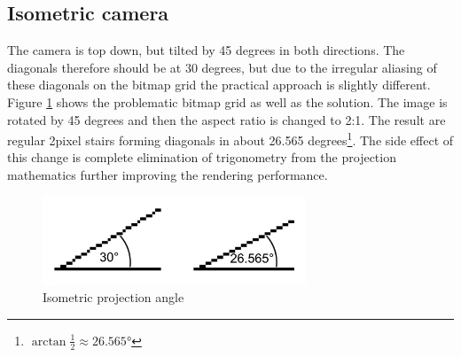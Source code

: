 \documentclass[11pt,oneside, final]{fithesis2}
\begin{document}
\subsection{Isometric camera}
The camera is top down, but tilted by 45 degrees in both directions. The diagonals therefore should be at 30 degrees, but due to the irregular aliasing of these diagonals on the bitmap grid the practical approach is slightly different. Figure \ref{isoangle} shows the problematic bitmap grid as well as the solution. The image is rotated by 45 degrees and then the aspect ratio is changed to 2:1. The result are regular 2pixel stairs forming diagonals in about 26.565 degrees\footnote{\begin{math}\arctan \frac{1}{2} \approx 26.565\si{\degree}\end{math}}. The side effect of this change is complete elimination of trigonometry from the projection mathematics further improving the rendering performance.

\begin{figure}[h]
	\centering
	\includegraphics[width=0.7\textwidth]{thesis-angles}
	\caption{Isometric projection angle}
	\label{isoangle}
\end{figure}
\end{document}

